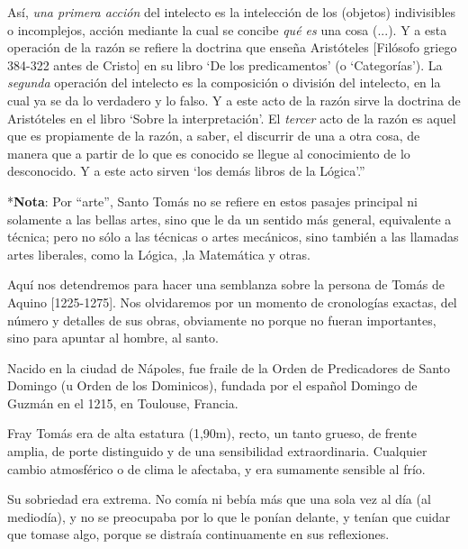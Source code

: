 \documentclass{article}
\begin{document}
    Así, \emph{una primera acción} del intelecto es la intelección de los (objetos) indivisibles o  incomplejos, acción mediante la cual se concibe \emph{qué es} una cosa (...). Y a esta operación de la razón se refiere la doctrina que enseña Aristóteles [Filósofo griego 384-322 antes de Cristo] en su libro `De los predicamentos' (o `Categorías'). La \emph{segunda} operación del intelecto es la composición o división del intelecto, en la cual ya se da lo verdadero y lo falso. Y a este acto de la razón sirve la doctrina de Aristóteles en el libro `Sobre la interpretación'. El \emph{tercer} acto de la razón es aquel que es propiamente de la razón, a saber, el discurrir de una a otra cosa, de manera que a partir de lo que es conocido se llegue al conocimiento de lo desconocido. Y a este acto sirven `los demás libros de la Lógica'.'' \par
    
    *\textbf{Nota}: Por ``arte'', Santo Tomás no se refiere en estos pasajes principal ni solamente a las bellas artes, sino que le da un sentido más general, equivalente a técnica; pero no sólo a las técnicas o artes mecánicos, sino también a las llamadas artes liberales, como la Lógica, ,la Matemática y otras. \par
    
    Aquí nos detendremos para hacer una semblanza sobre la persona de Tomás de Aquino [1225-1275]. Nos olvidaremos por un momento de cronologías exactas, del número y detalles de sus obras, obviamente no porque no fueran importantes, sino para apuntar al hombre, al santo. \par
    
    Nacido en la ciudad de Nápoles, fue fraile de la Orden de Predicadores de Santo Domingo (u Orden de los Dominicos), fundada por el español Domingo de Guzmán en el 1215, en  Toulouse, Francia. \par
    
    Fray Tomás era de alta estatura (1,90m), recto, un tanto grueso, de frente amplia, de porte distinguido y de una sensibilidad extraordinaria. Cualquier cambio atmosférico o de clima le afectaba, y era sumamente sensible al frío. \par
    
    Su sobriedad era extrema. No comía ni bebía más que una sola vez al día (al mediodía), y no se preocupaba por lo que le ponían delante, y tenían que cuidar que tomase algo, porque se distraía continuamente en sus reflexiones. \par
    
\end{document}

